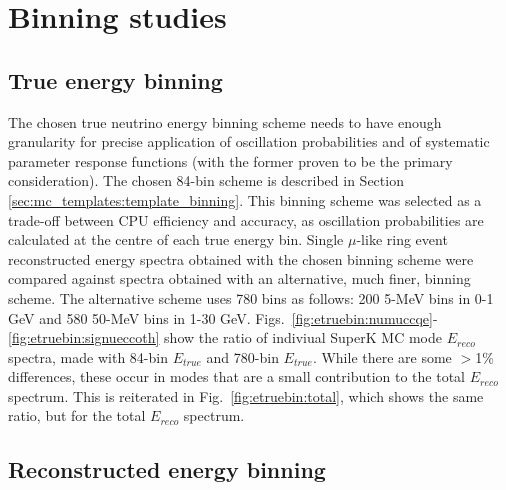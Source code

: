 \clearpage

\section{Binning studies}
\label{appendix:mc_template_binning_studies}

%
%


\subsection{True energy binning}
\label{appendix:mc_template_binning_studies:etrue}

The chosen true neutrino energy binning scheme needs to have enough granularity for precise application of oscillation
probabilities and of systematic parameter response functions (with the former proven to be the primary consideration).
The chosen 84-bin scheme is described in Section \ref{sec:mc_templates:template_binning}. 
This binning scheme was selected as a trade-off between CPU efficiency and accuracy,
as oscillation probabilities are calculated at the centre of each true energy bin.
Single $\mu$-like ring event reconstructed energy spectra obtained with the chosen binning scheme
were compared against spectra obtained with an alternative, much finer, binning scheme.
The alternative scheme uses 780 bins as follows:
200 5-MeV bins in 0-1 GeV and 580 50-MeV bins in 1-30 GeV.
Figs.\ \ref{fig:etruebin:numuccqe}-\ref{fig:etruebin:signueccoth} show the ratio of indiviual SuperK MC mode $E_{reco}$ spectra, made with 84-bin $E_{true}$ and 780-bin $E_{true}$.
While there are some $>$1\% differences, these occur in modes that are a small contribution to the total $E_{reco}$ spectrum.
This is reiterated in Fig.\ \ref{fig:etruebin:total}, which shows the same ratio, but for the total $E_{reco}$ spectrum.


\subsection{Reconstructed energy binning}
\label{appendix:mc_template_binning_studies:ereco}

